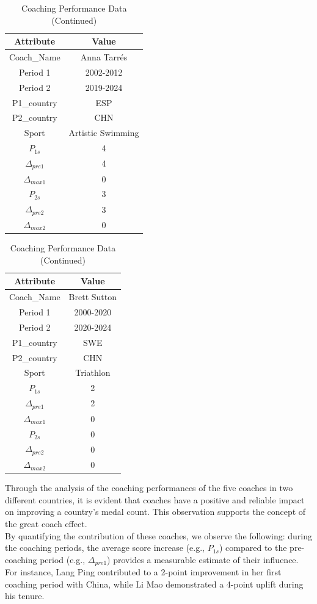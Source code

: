 \documentclass[12pt]{article}
\begin{document}
\begin{table}[h!]
\caption{Coaching Performance Data (Continued)}
\centering
\begin{tabular}{|c|c|}
\hline
\textbf{Attribute} & \textbf{Value} \\
\hline
Coach\_Name & Anna Tarrés \\
Period 1 & 2002-2012 \\
Period 2 & 2019-2024 \\
P1\_country & ESP \\
P2\_country & CHN \\
Sport & Artistic Swimming \\
$P_{1s}$ & 4 \\
$\Delta_{pre1}$ & 4 \\
$\Delta_{max1}$ & 0 \\
$P_{2s}$ & 3 \\
$\Delta_{pre2}$ & 3 \\
$\Delta_{max2}$ & 0 \\
\hline
\end{tabular}
\quad
\begin{tabular}{|c|c|}
\hline
\textbf{Attribute} & \textbf{Value} \\
\hline
Coach\_Name & Brett Sutton \\
Period 1 & 2000-2020 \\
Period 2 & 2020-2024 \\
P1\_country & SWE \\
P2\_country & CHN \\
Sport & Triathlon \\
$P_{1s}$ & 2 \\
$\Delta_{pre1}$ & 2 \\
$\Delta_{max1}$ & 0 \\
$P_{2s}$ & 0 \\
$\Delta_{pre2}$ & 0 \\
$\Delta_{max2}$ & 0 \\
\hline
\end{tabular}
\label{tab:coaching_data_cont}
\end{table}

Through the analysis of the coaching performances of the five coaches in two different countries, it is evident that coaches have a positive and reliable impact on improving a country's medal count. This observation supports the concept of the great coach effect.\\

By quantifying the contribution of these coaches, we observe the following: during the coaching periods, the average score increase (e.g., $P_{1s}$) compared to the pre-coaching period (e.g., $\Delta_{pre1}$) provides a measurable estimate of their influence. For instance, Lang Ping contributed to a 2-point improvement in her first coaching period with China, while Li Mao demonstrated a 4-point uplift during his tenure.\\
\end{document}
